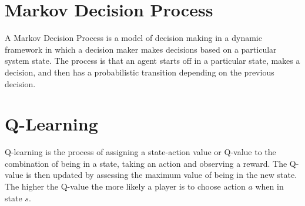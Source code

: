 \documentclass[a0,landscape]{a0poster}
\begin{document}
\begin{multicols}{3}
\color{SteelBlue}
\section*{Markov Decision Process}
A Markov Decision Process is a model of decision making in a dynamic framework in which a decision maker makes decisions based on a particular system state.
The process is that an agent starts off in a particular state, makes a decision, and then has a probabilistic transition depending on the previous decision.

\section*{Q-Learning}
Q-learning is the process of assigning a state-action value or Q-value to the combination of being in a state, taking an action and observing a reward.
The Q-value is then updated by assessing the maximum value of being in the new state.
The higher the Q-value the more likely a player is to choose action $a$ when in state $s$.


\end{multicols}
\end{document}
